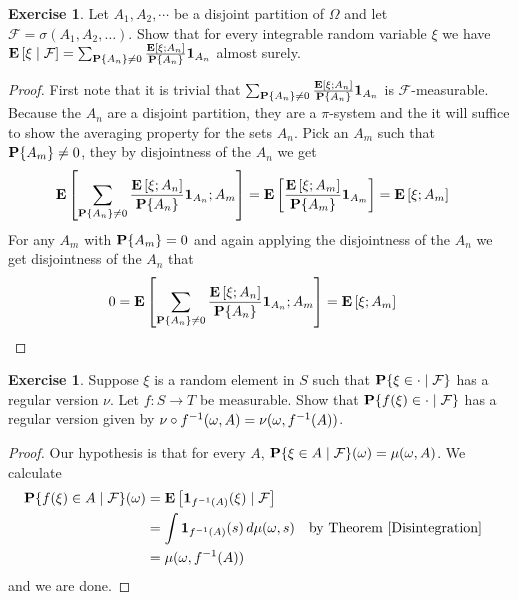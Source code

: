 \documentclass{amsart}
\theoremstyle{remark}
\theoremstyle{definition}
\newtheorem{ex}[thm]{Exercise}
\begin{document}
\begin{ex}Let $A_1, A_2, \cdots$ be a disjoint partition of $\Omega$
  and let $\mathcal{F} = \sigma(A_1, A_2, \dots)$.  Show that for
  every integrable random variable $\xi$ we have
$\cexpectationlong{\mathcal{F}}{\xi} = \sum_{\probability{A_n} \neq 0}
\frac{\expectation{\xi ; A_n}}{\probability{A_n}} \characteristic{A_n}$ almost surely.
\end{ex}
\begin{proof}First note that it is trivial that $\sum_{\probability{A_n} \neq 0}
\frac{\expectation{\xi ; A_n}}{\probability{A_n}}\characteristic{A_n}$ is
$\mathcal{F}$-measurable.  Because the $A_n$ are a disjoint partition,
  they are a $\pi$-system and the it will suffice to show the
  averaging property for the sets $A_n$.
Pick an $A_m$ such that $\probability{A_m} \neq 0$, they by
disjointness of the $A_n$ we get
\begin{align*}
\expectation{\sum_{\probability{A_n} \neq 0}
\frac{\expectation{\xi ; A_n}}{\probability{A_n}}
\characteristic{A_n}; A_m} &= \expectation{\frac{\expectation{\xi ;
    A_m}}{\probability{A_m}} \characteristic{A_m}} = \expectation{\xi ; A_m}
\end{align*}
For any $A_m$ with $\probability{A_m} = 0$ and again applying the
disjointness of the $A_n$ we get
disjointness of the $A_n$ that 
\begin{align*}
0 &= \expectation{\sum_{\probability{A_n} \neq 0}
\frac{\expectation{\xi ; A_n}}{\probability{A_n}}
\characteristic{A_n}; A_m}  = \expectation{\xi ; A_m}
\end{align*}
\end{proof}

\begin{ex}Suppose $\xi$ is a random element in $S$ such that
  $\cprobability{\mathcal{F}}{\xi \in \cdot}$ has a regular version
  $\nu$.  Let $f : S \to T$ be measurable.  Show that
  $\cprobability{\mathcal{F}}{f(\xi) \in \cdot}$ has a regular version
  given by $\pushforward{f} {\nu} (\omega, A) = \nu(\omega, f^{-1}(A))$.
\end{ex}
\begin{proof}
Our hypothesis is that for every $A$, $\cprobability{\mathcal{F}}{\xi
  \in A}(\omega) = \mu(\omega, A)$.  We calculate 
\begin{align*}
\cprobability{\mathcal{F}}{f(\xi) \in A}(\omega) &=
\cexpectationlong{\mathcal{F}}{\characteristic{f^{-1}(A)}(\xi)} \\
&=\int \characteristic{f^{-1}(A)}(s) \, d\mu(\omega, s) & & \text{by
  Theorem \ref{Disintegration}} \\
&=\mu(\omega, f^{-1}(A))
\end{align*}
and we are done.
\end{proof}
\end{document}

